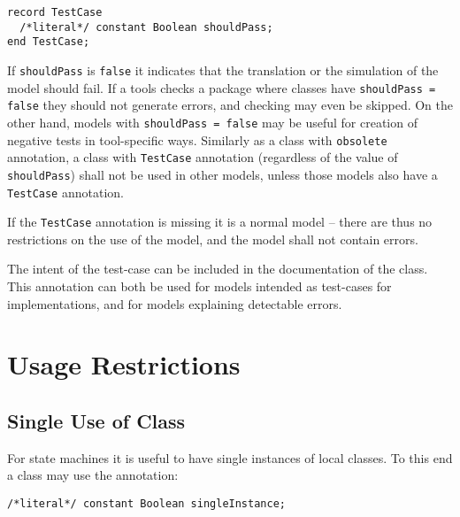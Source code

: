 \begin{annotationdefinition}[TestCase]
\begin{synopsis}\begin{lstlisting}
record TestCase
  /*literal*/ constant Boolean shouldPass;
end TestCase;
\end{lstlisting}\end{synopsis}
\begin{semantics}
If \lstinline!shouldPass! is \lstinline!false! it indicates that the translation or the simulation of the model should fail.
If a tools checks a package where classes have \lstinline!shouldPass = false! they should not generate errors, and checking may even be skipped.
On the other hand, models with \lstinline!shouldPass = false! may be useful for creation of negative tests in tool-specific ways.
Similarly as a class with \lstinline!obsolete! annotation, a class with \lstinline!TestCase! annotation (regardless of the value of \lstinline!shouldPass!) shall not be used in other models, unless those models also have a \lstinline!TestCase! annotation.

If the \lstinline!TestCase! annotation is missing it is a normal model -- there are thus no restrictions on the use of the model, and the model shall not contain errors.

\begin{nonnormative}
The intent of the test-case can be included in the documentation of the class.
This annotation can both be used for models intended as test-cases for implementations, and for models explaining detectable errors.
\end{nonnormative}
\end{semantics}
\end{annotationdefinition}


\section{Usage Restrictions}\label{usage-restrictions}
\subsection{Single Use of Class}\label{annotation-for-single-use-of-class}\label{single-use-of-class}

For state machines it is useful to have single instances of local classes.
To this end a class may use the annotation:
\begin{lstlisting}[language=modelica]
/*literal*/ constant Boolean singleInstance;
\end{lstlisting}%

